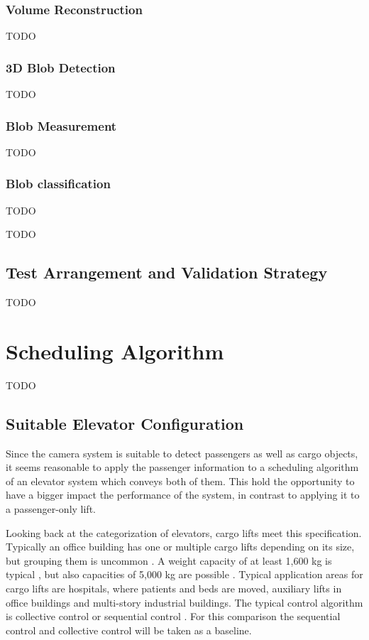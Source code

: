 \subsubsection{Volume Reconstruction}
TODO

\subsubsection{3D Blob Detection}
TODO

\subsubsection{Blob Measurement}
TODO

\subsubsection{Blob classification}
TODO

TODO
\subsection{Test Arrangement and Validation Strategy}
TODO

\section{Scheduling Algorithm}
TODO
\subsection{Suitable Elevator Configuration}
Since the camera system is suitable to detect passengers as well as cargo objects,
it seems reasonable to apply the passenger information 
to a scheduling algorithm of an elevator system which conveys both of them.
This hold the opportunity to have a bigger impact the performance of the system, 
in contrast to applying it to a passenger-only lift.

Looking back at the categorization of elevators, cargo lifts meet this specification.
Typically an office building has one or multiple cargo lifts depending on its size,
but grouping them is uncommon \autocite[][p.~167]{barney2016handbook}.
A weight capacity of at least 1,600 kg is typical \autocite[][p.~167]{barney2016handbook},
but also capacities of 5,000 kg are possible \autocite[][]{kone2017overview}.
Typical application areas for cargo lifts are hospitals, where patients and beds are moved,
auxiliary lifts in office buildings and multi-story industrial buildings.
The typical control algorithm is collective control or sequential control \autocite[][pp.~238,~244]{barney2016handbook}.
For this comparison the sequential control and collective control will be taken as a baseline.

